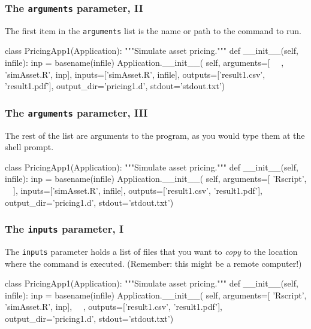 \documentclass[english,serif,mathserif,xcolor=pdftex,dvipsnames,table]{beamer}
\begin{document}
\begin{frame}[fragile]
\frametitle{The \texttt{arguments} parameter, II}

The first item in the \texttt{arguments} list is the name or path to the command to run.

  \+
\begin{python}
class PricingApp1(Application):
  """Simulate asset pricing."""
  def __init__(self, infile):
    inp = basename(infile)
    Application.__init__(
      self,
      arguments=[
        ~~, 'simAsset.R', inp],
      inputs=['simAsset.R', infile],
      outputs=['result1.csv', 'result1.pdf'],
      output_dir='pricing1.d',
      stdout='stdout.txt')
\end{python}
\end{frame}

\begin{frame}[fragile]
\frametitle{The \texttt{arguments} parameter, III}

The rest of the list are arguments to the program, as you would type
them at the shell prompt.

  \+
\begin{python}
class PricingApp1(Application):
  """Simulate asset pricing."""
  def __init__(self, infile):
    inp = basename(infile)
    Application.__init__(
      self,
      arguments=[
        'Rscript', ~~],
      inputs=['simAsset.R', infile],
      outputs=['result1.csv', 'result1.pdf'],
      output_dir='pricing1.d',
      stdout='stdout.txt')
\end{python}
\end{frame}


\begin{frame}[fragile]
\frametitle{The \texttt{inputs} parameter, I}

The \texttt{inputs} parameter holds a list of files that you want to
\emph{copy} to the location where the command is executed. (Remember:
this might be a remote computer!)

  \+
\begin{python}
class PricingApp1(Application):
  """Simulate asset pricing."""
  def __init__(self, infile):
    inp = basename(infile)
    Application.__init__(
      self,
      arguments=[
        'Rscript', 'simAsset.R', inp],
      ~~,
      outputs=['result1.csv', 'result1.pdf'],
      output_dir='pricing1.d',
      stdout='stdout.txt')
\end{python}
\end{frame}
\end{document}
